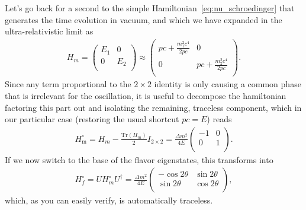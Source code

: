 Let's go back for a second to the simple Hamiltonian~\eqref{eq:nu_schroedinger}
that generates the time evolution in vacuum, and which we have expanded in the
ultra-relativistic limit as
\begin{align*}
  H_m =
  \begin{pmatrix}
  E_1 & 0\\
  0 & E_2\\
  \end{pmatrix} \approx
  \begin{pmatrix}
  pc + \frac{m_1^2 c^4}{2pc} & 0\\
  0 & pc + \frac{m_2^2 c^4}{2pc}\\
  \end{pmatrix}.
\end{align*}
Since any term proportional to the $2 \times 2$ identity is only causing a common
phase that is irrelevant for the oscillation, it is useful to decompose the
hamiltonian factoring this part out and isolating the remaining, traceless
component, which in our particular case (restoring the usual shortcut $pc = E$)
reads
\begin{align*}
  H^\circ_\text{m} =
  H_m - \frac{\text{Tr}(H_m)}{2} I_{2 \times 2} =
  \frac{\Delta m^2}{4E}
  \begin{pmatrix}
    -1 & 0\\
    0 & 1\\
  \end{pmatrix}.
\end{align*}
If we now switch to the base of the flavor eigenstates, this transforms into
\begin{align}\label{eq:vacuum_hamiltonian_flavor}
  H^\circ_f =
  U H^\circ_m U^\dag = \frac{\Delta m^2}{4E}
  \begin{pmatrix}
   -\cos2\theta & \sin2\theta\\
   \sin2\theta & \cos2\theta\\
  \end{pmatrix},
\end{align}
which, as you can easily verify, is automatically traceless.

